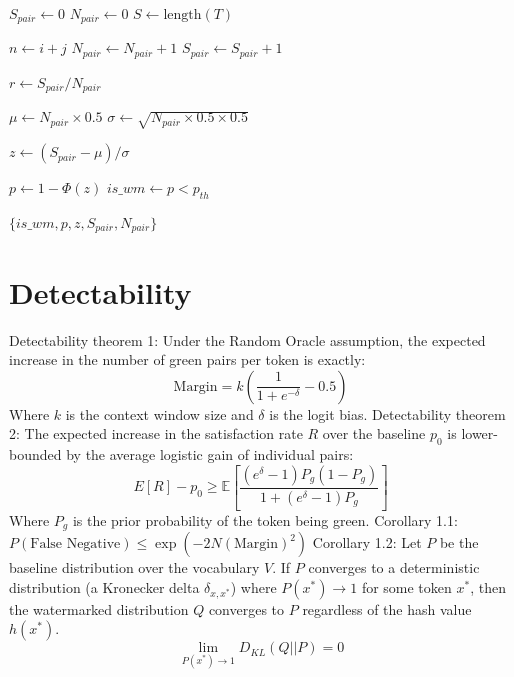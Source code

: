\documentclass{article}
\begin{document}
\begin{algorithm}
\caption{\texttt{detect}}
\label{alg:detect}
\begin{algorithmic}[1]
    \State $S_{pair} \gets 0$ 
    \State $N_{pair} \gets 0$ 
    \State $S \gets \text{length}(T)$ 
    
            \State $n \gets i + j$ 
                \State $N_{pair} \gets N_{pair} + 1$
                    \State $S_{pair} \gets S_{pair} + 1$
                \EndIf
            \EndIf
        \EndFor
    \EndFor
    
        \State $r \gets S_{pair} / N_{pair}$ 
    \EndIf
    
    \State $\mu \gets N_{pair} \times 0.5$
    \State $\sigma \gets \sqrt{N_{pair} \times 0.5 \times 0.5}$
    
    \State $z \gets (S_{pair} - \mu) / \sigma$
    
    \State $p \gets 1 - \Phi(z)$ 
    \State $is\_wm \gets p < p_{th}$
    
    \State \Return $\{is\_wm, p, z, S_{pair}, N_{pair}\}$
\EndProcedure
\end{algorithmic}
\end{algorithm}
\newpage
\section{Detectability}
Detectability theorem 1:
Under the Random Oracle assumption, the expected increase in the number of green pairs per token is exactly:$$\text{Margin} = k \left( \frac{1}{1 + e^{-\delta}} - 0.5 \right)$$Where $k$ is the context window size and $\delta$ is the logit bias.
\newline
Detectability theorem 2:
The expected increase in the satisfaction rate $R$ over the baseline $p_0$ is lower-bounded by the average logistic gain of individual pairs:$$E[R] - p_0 \geq \mathbb{E}\left[ \frac{(e^\delta - 1) P_g (1 - P_g)}{1 + (e^\delta - 1) P_g} \right]$$Where $P_g$ is the prior probability of the token being green.
\newline
Corollary 1.1: $P(\text{False Negative}) \leq \exp\left( -2 N \left( \text{Margin} \right)^2 \right)$
\newline
Corollary 1.2: Let $P$ be the baseline distribution over the vocabulary $V$. If $P$ converges to a deterministic distribution (a Kronecker delta $\delta_{x, x^*}$) where $P(x^*) \to 1$ for some token $x^*$, then the watermarked distribution $Q$ converges to $P$ regardless of the hash value $h(x^*)$.$$\lim_{P(x^*) \to 1} D_{KL}(Q || P) = 0$$
\end{document}
